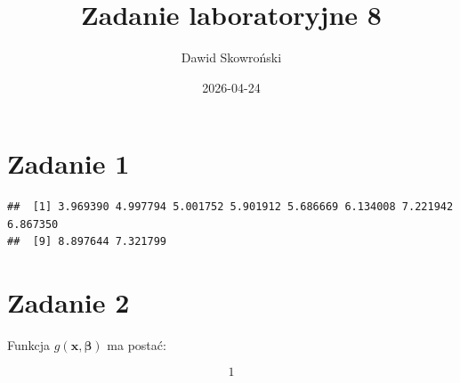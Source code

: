 \documentclass[
]{article}
\title{Zadanie laboratoryjne 8}
\author{Dawid Skowroński}
\date{2026-04-24}
\begin{document}
\maketitle

\hypertarget{zadanie-1}{%
\section{Zadanie 1}\label{zadanie-1}}

\begin{verbatim}
##  [1] 3.969390 4.997794 5.001752 5.901912 5.686669 6.134008 7.221942 6.867350
##  [9] 8.897644 7.321799
\end{verbatim}

\hypertarget{zadanie-2}{%
\section{Zadanie 2}\label{zadanie-2}}

Funkcja \(g(\bm{x}, \bm{\beta})\) ma postać:

\[1\]
\end{document}
